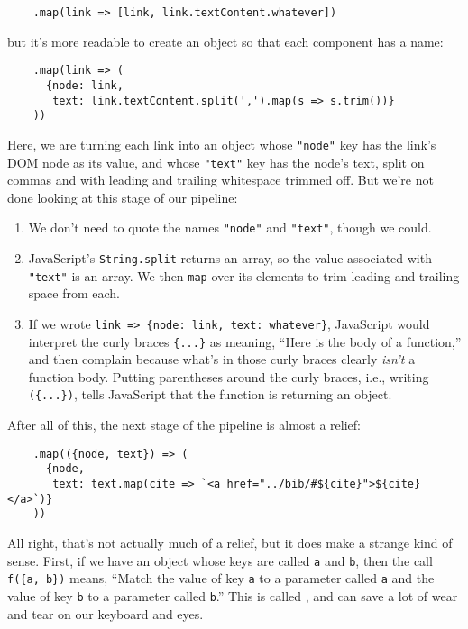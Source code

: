\begin{verbatim}
    .map(link => [link, link.textContent.whatever])
\end{verbatim}

\noindent
but it's more readable to create an object so that each component has a name:

\begin{verbatim}
    .map(link => (
      {node: link,
       text: link.textContent.split(',').map(s => s.trim())}
    ))
\end{verbatim}

Here,
we are turning each link into an object whose \texttt{"node"} key has the link's DOM node as its value,
and whose \texttt{"text"} key has the node's text,
split on commas and with leading and trailing whitespace trimmed off.
But we're not done looking at this stage of our pipeline:

\begin{enumerate}
\item
  We don't need to quote the names \texttt{"node"} and \texttt{"text"}, though we could.
\item
  JavaScript's \texttt{String.split} returns an array,
  so the value associated with \texttt{"text"} is an array.
  We then \texttt{map} over its elements to trim leading and trailing space from each.
\item
  If we wrote \texttt{link\ ={\textgreater}{}\ \{node:\ link,\ text:\ whatever\}},
  JavaScript would interpret the curly braces \texttt{\{...\}} as meaning,
  ``Here is the body of a function,''
  and then complain because what's in those curly braces clearly \emph{isn't} a function body.
  Putting parentheses around the curly braces,
  i.e., writing \texttt{(\{...\})},
  tells JavaScript that the function is returning an object.
\end{enumerate}

After all of this,
the next stage of the pipeline is almost a relief:

\begin{verbatim}
    .map(({node, text}) => (
      {node,
       text: text.map(cite => `<a href="../bib/#${cite}">${cite}</a>`)}
    ))
\end{verbatim}

All right,
that's not actually much of a relief,
but it does make a strange kind of sense.
First,
if we have an object whose keys are called \texttt{a} and \texttt{b},
then the call \texttt{f(\{a,\ b\})} means,
``Match the value of key \texttt{a} to a parameter called \texttt{a}
and the value of key \texttt{b} to a parameter called \texttt{b}.''
This is called ,
and can save a lot of wear and tear on our keyboard and eyes.


